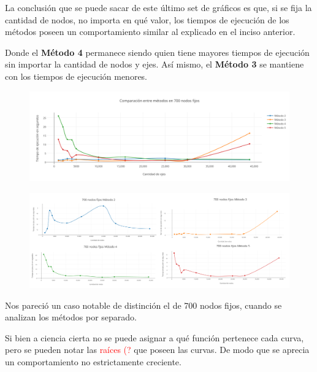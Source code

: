 La conclusi\'on que se puede sacar de este \'ultimo set de gr\'aficos es que, si se fija la cantidad de nodos, no importa en qu\'e valor, los tiempos de ejecuci\'on de los m\'etodos poseen un comportamiento similar al explicado en el inciso anterior.

Donde el \textbf{M\'etodo 4} permanece siendo quien tiene mayores tiempos de ejecuci\'on sin importar la cantidad de nodos y ejes. As\'i mismo, el \textbf{M\'etodo 3} se mantiene con los tiempos de ejecuci\'on menores.

  \begin{figure}[h!]
   \begin{center}
 	\includegraphics[scale=0.55]{imagenes/local/tiempos/700nodos.png}
   \end{center}
 \end{figure} 
 
   \begin{figure}[h!]
   \begin{center}
 	\includegraphics[scale=0.08]{imagenes/local/tiempos/700nodos2.png}
   \end{center}
 \end{figure} 
 
Nos pareci\'o un caso notable de distinci\'on el de 700 nodos fijos, cuando se analizan los m\'etodos por separado. 

Si bien a ciencia cierta no se puede asignar a qu\'e funci\'on pertenece cada curva, pero se pueden notar las \textcolor{red}{ra\'ices (?} que poseen las curvas. De modo que se aprecia un comportamiento no estrictamente creciente. 

